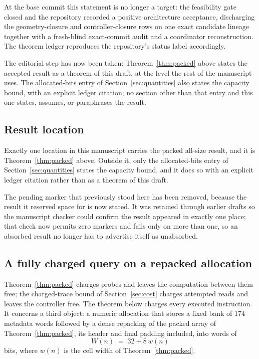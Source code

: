 \documentclass[11pt]{article}
\theoremstyle{definition}
\theoremstyle{remark}
\begin{document}
At the base commit this statement is no longer a target: the feasibility
gate closed and the repository recorded a positive architecture acceptance,
discharging the geometry-closure and controller-closure rows on one exact
candidate lineage together with a fresh-blind exact-commit audit and a
coordinator reconstruction. The theorem ledger reproduces the repository's
status label accordingly.

The editorial step has now been taken: Theorem~\ref{thm:packed} above states
the accepted result as a theorem of this draft, at the level the rest of the
manuscript uses. The allocated-bits entry of Section~\ref{sec:quantities}
also states the capacity bound, with an explicit ledger citation; no section
other than that entry and this one states, assumes, or paraphrases the
result.

\subsection{Result location}\label{sec:insertion}

Exactly one location in this manuscript carries the packed all-size result,
and it is Theorem~\ref{thm:packed} above. Outside it, only the allocated-bits
entry of Section~\ref{sec:quantities} states the capacity bound, and it does
so with an explicit ledger citation rather than as a theorem of this draft.

The pending marker that previously stood here has been removed, because the
result it reserved space for is now stated. It was retained through earlier
drafts so the manuscript checker could confirm the result appeared in exactly
one place; that check now permits zero markers and fails only on more than
one, so an absorbed result no longer has to advertise itself as unabsorbed.

\subsection{A fully charged query on a repacked allocation}
\label{sec:fullycharged}

Theorem~\ref{thm:packed} charges probes and leaves the computation between
them free; the charged-trace bound of Section~\ref{sec:cost} charges
attempted reads and leaves the controller free. The theorem below charges
every executed instruction. It concerns a third object: a numeric allocation
that stores a fixed bank of $174$ metadata words followed by a dense
repacking of the packed array of Theorem~\ref{thm:packed}, its header and
final padding included, into words of
\[
  W(n) \;=\; 32 + 8\,w(n)
\]
bits, where $w(n)$ is the cell width of Theorem~\ref{thm:packed}.
\end{document}
